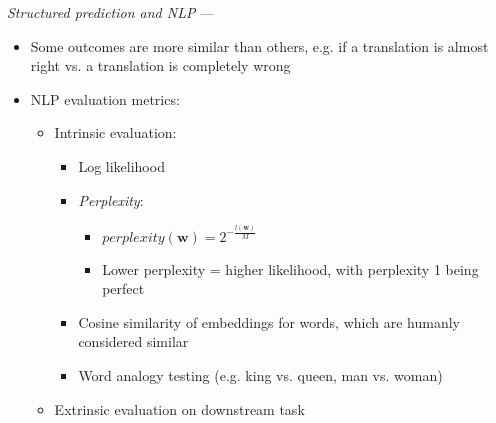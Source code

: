 \emph{Structured prediction and NLP} --- 
\begin{itemize}
    \item Some outcomes are more similar than others, e.g. if a translation is almost right vs. a translation is completely wrong
    \item NLP evaluation metrics:
    \begin{itemize}
        \item Intrinsic evaluation:
        \begin{itemize}
            \item Log likelihood
            \item \emph{Perplexity}:
            \begin{itemize}
                \item $perplexity(\boldsymbol{w}) = 2^{-\frac{l(\boldsymbol{w})}{M}}$
                \item Lower perplexity = higher likelihood, with perplexity 1 being perfect
            \end{itemize}
            \item Cosine similarity of embeddings for words, which are humanly considered similar
            \item Word analogy testing (e.g. king vs. queen, man vs. woman)
        \end{itemize}
        \item Extrinsic evaluation on downstream task
    \end{itemize}
\end{itemize}